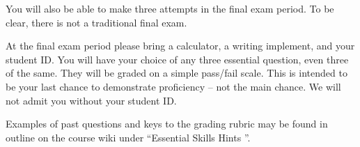 \documentclass[letterpaper,10pt]{article}
\begin{document}
You will also be able to make three attempts in the
final exam period.   To be clear, there is not a traditional final exam.


At the final exam period please bring a calculator, a writing implement, and
your student ID.  You will have your choice of any three essential
question, even three of the same.  They will be graded on a simple
pass/fail scale.  This is intended to be your last chance to
demonstrate proficiency -- not the main chance.  We will not admit you
without your student ID.

Examples of past questions and keys to the grading rubric may be found
in outline on the course wiki under ``Essential Skills Hints ''.



\end{document}
